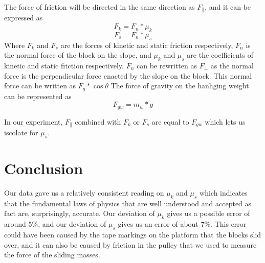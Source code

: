 \documentclass[12pt]{article}
\begin{document}
            \par The force of friction will be directed in the same direction
            as $F_{\parallel}$, and it can be expressed as
            \begin{equation}
                F_k = F_n * \mu_k
            \end{equation}
            \begin{equation}
                F_s = F_n * \mu_s
            \end{equation}
            Where $F_k$ and $F_s$ are the forces of kinetic and static friction
            respectively, $F_n$ is the normal force of the block on the slope,
            and $\mu_k$ and $\mu_s$ are the coefficients of kinetic and static
            friction respectively. $F_n$ can be rewritten as $F_{\bot}$
            as the normal force is the perpendicular force enacted by the slope
            on the block. This normal force can be written as $F_g *\cos{\theta}$
            The force of gravity on the hanhging weight can be represented as
            \begin{equation}
                F_{gw} = m_w * g
            \end{equation}
            \par In our experiment, $F_{\parallel}$ combined with $F_k$ or $F_s$
            are equal to $F_{gw}$ which lets us iscolate for $\mu_s$.
    \section{Conclusion}
        Our data gave us a relatively consistent reading on $\mu_k$ and $\mu_s$ which
        indicates that the fundamental laws of physics that are well understood
        and accepted as fact are, surprisingly, accurate. Our deviation of $\mu_k$
        gives us a possible error of around 5\%, and our deviation of $\mu_s$ gives
        us an error of about 7\%. This error could have been caused by the tape
        markings on the platform that the blocks slid over, and it can also be
        caused by friction in the pulley that we used to measure the force of the
        sliding masses.
\end{document}
